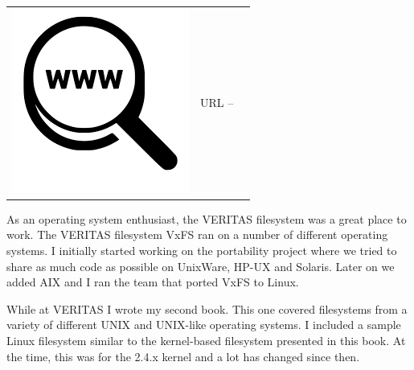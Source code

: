 \begin{table}[h]
\begin{tabular}{lcl}
\parbox[r]{0.5in}{\includegraphics[scale=0.15]{figures/url.png}} & \parbox[l]{0.55in}{URL  -- } & \parbox[l]{3in}{}
\end{tabular}
\end{table}

\noindent
As an operating system enthusiast, the VERITAS filesystem was a great place to work. The VERITAS filesystem VxFS ran on a number of different operating systems. I initially started working on the portability project where we tried to share as much code as possible on UnixWare, HP-UX and Solaris. Later on we added AIX and I ran the team that ported VxFS to Linux. 

While at VERITAS I wrote my second book. This one covered filesystems from a variety of different UNIX and UNIX-like operating systems. I included a sample Linux filesystem similar to the kernel-based filesystem presented in this book. At the time, this was for the 2.4.x kernel and a lot has changed since then.

